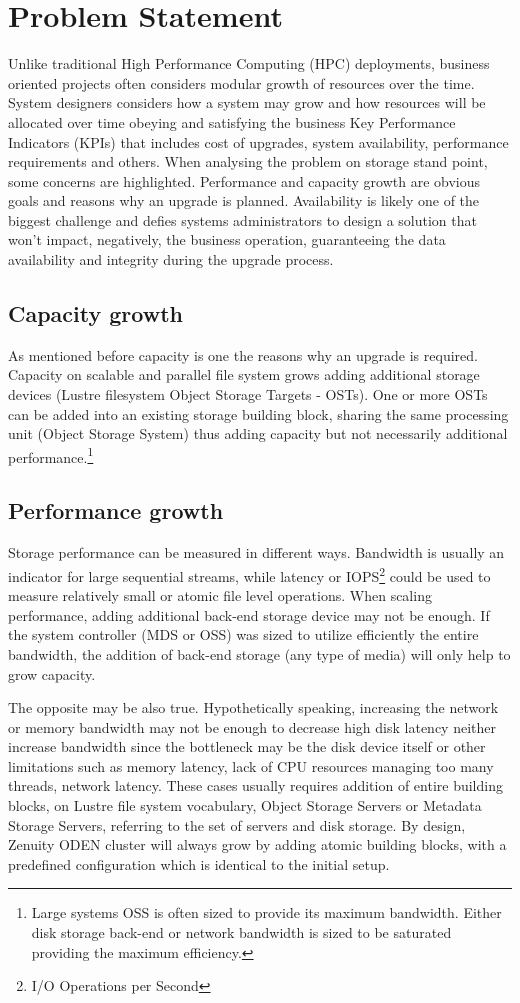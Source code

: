 \documentclass{article}
\begin{document}
\section{Problem Statement}
Unlike traditional High Performance Computing (HPC) deployments, business oriented projects often considers modular growth of resources over the time. System designers considers how a system may grow and how resources will be allocated over time obeying and satisfying the business Key Performance Indicators (KPIs) that includes cost of upgrades, system availability, performance requirements and others. 
When analysing the problem on storage stand point, some concerns are highlighted. Performance and capacity growth are obvious goals and reasons why an upgrade is planned. Availability is likely one of the biggest challenge and defies systems administrators to design a solution that won't impact, negatively, the business operation, guaranteeing the data availability and integrity during the upgrade process.

\subsection{Capacity growth}
As mentioned before capacity is one the reasons why an upgrade is required. Capacity on scalable and parallel file system grows adding additional storage devices (Lustre filesystem Object Storage Targets - OSTs). One or more OSTs can be added into an existing storage building block, sharing the same processing unit (Object Storage System) thus adding capacity but not necessarily additional performance.\footnote{Large systems OSS is often sized to provide its maximum bandwidth. Either disk storage back-end or network bandwidth is sized to be saturated providing the maximum efficiency.}
\subsection{Performance growth}
Storage performance can be measured in different ways. Bandwidth is usually an indicator for large sequential streams, while latency or IOPS\footnote{I/O Operations per Second} could be used to measure relatively small or atomic file level operations. When scaling performance, adding additional back-end storage device may not be enough. If the system controller (MDS or OSS) was sized to utilize efficiently the entire bandwidth, the addition of back-end storage (any type of media) will only help to grow capacity.

The opposite may be also true. Hypothetically speaking, increasing the network or memory bandwidth may not be enough to decrease high disk latency neither increase bandwidth since the bottleneck may be the disk device itself or other limitations such as memory latency, lack of CPU resources managing too many threads, network latency.
These cases usually requires addition of entire building blocks, on Lustre file system vocabulary, Object Storage Servers or Metadata Storage Servers, referring to the set of servers and disk storage. 
By design, Zenuity ODEN cluster will always grow by adding atomic building blocks, with a predefined configuration which is identical to the initial setup.
\end{document}
